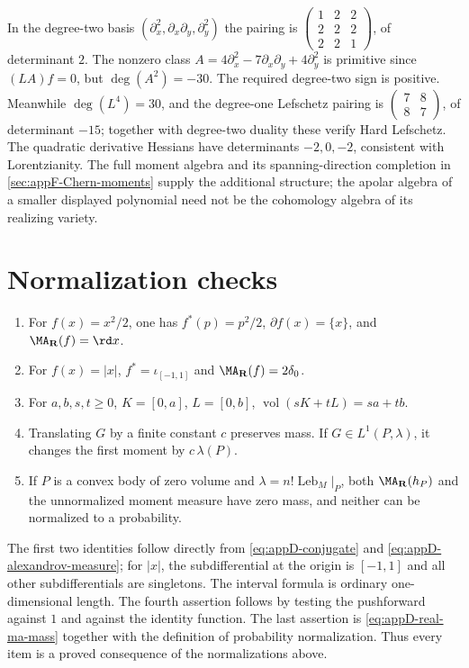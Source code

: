 In the degree-two basis
$(\partial_x^2,\partial_x\partial_y,\partial_y^2)$ the pairing is
$\left(\begin{smallmatrix}1&2&2\\2&2&2\\2&2&1\end{smallmatrix}\right)$,
of determinant $2$. The nonzero class
$A=4\partial_x^2-7\partial_x\partial_y+4\partial_y^2$
is primitive since $(LA)f=0$, but $\deg(A^2)=-30$.
The required degree-two sign is positive. Meanwhile
$\deg(L^4)=30$, and the degree-one Lefschetz pairing is
$\left(\begin{smallmatrix}7&8\\8&7\end{smallmatrix}\right)$,
of determinant $-15$; together with degree-two duality these
verify Hard Lefschetz. The quadratic derivative Hessians have
determinants $-2,0,-2$, consistent with Lorentzianity.
The full moment algebra and its spanning-direction completion in
\cref{sec:appF-Chern-moments} supply the additional structure;
the apolar algebra of a smaller displayed polynomial need not be
the cohomology algebra of its realizing variety.

\section{Normalization checks}
\label{sec:appD-unit-tests}

\begin{enumerate}
\item For \(f(x)=x^2/2\), one has
      \(f^*(p)=p^2/2\), \(\partial f(x)=\{x\}\), and
      \(\MA_{\mathbf R}(f)=\rd x\).
\item For \(f(x)=|x|\),
      \(f^*=\iota_{[-1,1]}\) and
      \(\MA_{\mathbf R}(f)=2\delta_0\).
\item For \(a,b,s,t\geq0\), \(K=[0,a]\), \(L=[0,b]\),
      \(\operatorname{vol}(sK+tL)=sa+tb\).
\item Translating \(G\) by a finite constant \(c\) preserves mass.  If
      \(G\in L^1(P,\lambda)\), it changes the first moment by
      \(c\,\lambda(P)\).
\item If \(P\) is a convex body of zero volume and
      \(\lambda=n!\operatorname{Leb}_M|_P\), both
      \(\MA_{\mathbf R}(h_P)\) and the unnormalized moment measure have zero
      mass, and neither can be normalized to a probability.
\end{enumerate}

The first two identities follow directly from
\eqref{eq:appD-conjugate} and \eqref{eq:appD-alexandrov-measure}; for
\(|x|\), the subdifferential at the origin is \([-1,1]\) and all other
subdifferentials are singletons.  The interval formula is ordinary
one-dimensional length.  The fourth assertion follows by testing the
pushforward against \(1\) and against the identity function.  The last
assertion is \eqref{eq:appD-real-ma-mass} together with the definition of
probability normalization.  Thus every item is a proved consequence of the
normalizations above.

